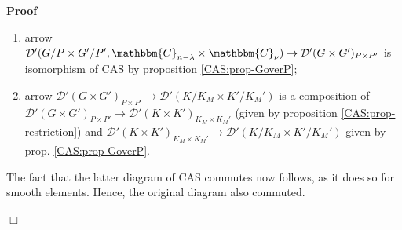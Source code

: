 \documentclass{article}
\newcommand{\nobracket}{}
\newenvironment{proof}{\noindent\textbf{Proof\ }}{\hspace*{\fill}$\Box$\medskip}
\begin{document}
\begin{proof}
\begin{enumerate}
    \item arrow $\mathcal{D}' (G / P \times G' / P', \mathbbm{C}_{n - \lambda}
    \nobracket \times \mathbbm{C}_{\nu} \nobracket) \rightarrow \mathcal{D}'
    (G \nobracket \times G' \nobracket)_{P \times P'}$ is isomorphism of CAS
    by proposition \ref{CAS:prop-GoverP};
    
    \item arrow $\mathcal{D}' (G \nobracket \times G' \nobracket)_{P \times
    P'} \rightarrow \mathcal{D}' (K / K_M \times K' / K_M')$ is a composition
    of $\mathcal{D}' (G \times G')_{P \times P'} \rightarrow \mathcal{D}' (K
    \times K')_{K_M \times K_M'}$ (given by proposition
    \ref{CAS:prop-restriction}) and $\mathcal{D}' (K \times K')_{K_M \times
    K_M'} \rightarrow \mathcal{D}' (K / K_M \times K' / K_M')$ given by prop.
    \ref{CAS:prop-GoverP}.
  \end{enumerate}
  The fact that the latter diagram of CAS commutes now follows, as it does so
  for smooth elements. Hence, the original diagram also commuted.
  

\end{proof}
\end{document}
